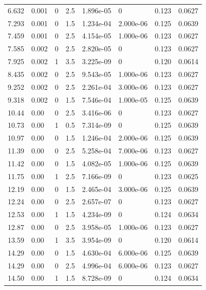 \documentclass[preview]{standalone}
\begin{document}
{{\begin{tabular}{L{1.2cm}C{1.2cm} C{0.3cm}C{0.5cm} C{1.4cm}C{1.4cm} C{1.4cm}C{1.4cm}}
  6.632  &  0.001  & 0     & 2.5 &  1.896e-05  & 0  & 0.123 &  0.0627   \\ 
  7.293  &  0.001  & 0     & 1.5 &  1.234e-04  & 2.000e-06  & 0.125 &  0.0639   \\ 
  7.459  &  0.001  & 0     & 2.5 &  4.154e-05  & 1.000e-06  & 0.123 &  0.0627   \\ 
  7.585  &  0.002  & 0     & 2.5 &  2.820e-05  & 0  & 0.123 &  0.0627   \\ 
  7.925  &  0.002  & 1     & 3.5 &  3.225e-09  & 0  & 0.120 &  0.0614   \\ 
  8.435  &  0.002  & 0     & 2.5 &  9.543e-05  & 1.000e-06  & 0.123 &  0.0627   \\ 
  9.252  &  0.002  & 0     & 2.5 &  2.261e-04  & 3.000e-06  & 0.123 &  0.0627   \\ 
  9.318  &  0.002  & 0     & 1.5 &  7.546e-04  & 1.000e-05  & 0.125 &  0.0639   \\ 
  10.44  &  0.00  & 0     & 2.5 &  3.416e-06  & 0  & 0.123 &  0.0627   \\ 
  10.73  &  0.00  & 1     & 0.5 &  7.314e-09  & 0  & 0.125 &  0.0639   \\ 
  10.97  &  0.00  & 0     & 1.5 &  1.246e-04  & 2.000e-06  & 0.125 &  0.0639   \\ 
  11.39  &  0.00  & 0     & 2.5 &  5.258e-04  & 7.000e-06  & 0.123 &  0.0627   \\ 
  11.42  &  0.00  & 0     & 1.5 &  4.082e-05  & 1.000e-06  & 0.125 &  0.0639   \\ 
  11.75  &  0.00  & 1     & 2.5 &  7.166e-09  & 0  & 0.123 &  0.0625   \\ 
  12.19  &  0.00  & 0     & 1.5 &  2.465e-04  & 3.000e-06  & 0.125 &  0.0639   \\ 
  12.24  &  0.00  & 0     & 2.5 &  2.657e-07  & 0  & 0.123 &  0.0627   \\ 
  12.53  &  0.00  & 1     & 1.5 &  4.234e-09  & 0  & 0.124 &  0.0634   \\ 
  12.87  &  0.00  & 0     & 2.5 &  3.958e-05  & 1.000e-06  & 0.123 &  0.0627   \\ 
  13.59  &  0.00  & 1     & 3.5 &  3.954e-09  & 0  & 0.120 &  0.0614   \\ 
  14.29  &  0.00  & 0     & 1.5 &  4.630e-04  & 6.000e-06  & 0.125 &  0.0639   \\ 
  14.29  &  0.00  & 0     & 2.5 &  4.996e-04  & 6.000e-06  & 0.123 &  0.0627   \\ 
  14.50  &  0.00  & 1     & 1.5 &  8.728e-09  & 0  & 0.124 &  0.0634   \\ 

\end{tabular}}}
\end{document}

